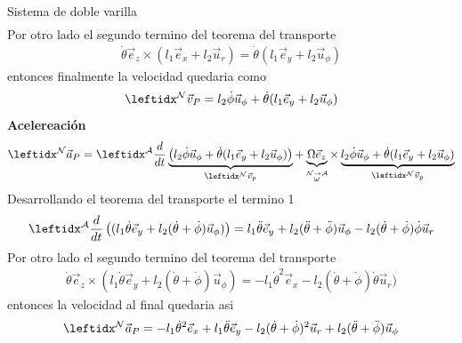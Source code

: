 \begin{solucion}{Sistema de doble varilla}
\begin{align}
        \end{align}
        Por otro lado el segundo termino del teorema del transporte
        \begin{align}
            \dot\theta\vec{e}_z\times (l_1\vec{e}_x+l_2\vec{u}_r)=\dot\theta(l_1\vec{e}_y+l_2\vec{u}_\phi)
        \end{align}
        entonces finalmente la velocidad quedaria como
        $$\marc{}{N}\vec{v}_P=l_2\dot\phi\vec{u}_\phi+\dot\theta(l_1\vec{e}_y+l_2\vec{u}_\phi)$$
    \textbf{Acelereación}\\
    \begin{equation*}
            \marc{}{N}\vec{a}_P=\transD{l_2\dot\phi\vec{u}_\phi+\dot\theta(l_1\vec{e}_y+l_2\vec{u}_\phi)}{\Omega\vec{e}_z}{N}{A}{\marc{}{N}\vec{v}_p}
        \end{equation*}
        Desarrollando el teorema del transporte el termino 1
        \begin{align}
            \der{}{A}\left((l_1\dot\theta\vec{e}_y+l_2(\dot\theta+\dot\phi)\vec{u}_\phi)\right)=l_1\ddot\theta\vec{e}_y+l_2(\ddot\theta+\ddot\phi)\vec{u}_\phi-l_2(\dot\theta+\dot\phi)\dot\phi\vec{u}_r
        \end{align}
        Por otro lado el segundo termino del teorema del transporte
        \begin{align}
            \dot \theta\vec{e}_z\times(l_1\dot\theta\vec{e}_y+l_2(\dot\theta+\dot\phi)\vec{u}_\phi)=-l_1\dot\theta^2\vec{e}_x-l_2(\dot\theta+\dot\phi)\dot\theta\vec{u}_r)
        \end{align}
        entonces la velocidad al final quedaria asi
        $$\marc{}{N}\vec{a}_P = -l_1 \dot{\theta}^2 \vec{e}_x + l_1 \ddot{\theta} \vec{e}_y - l_2 (\dot{\theta} + \dot{\phi})^2 \vec{u}_r + l_2 (\ddot{\theta} + \ddot{\phi}) \vec{u}_\phi$$
\end{solucion}

